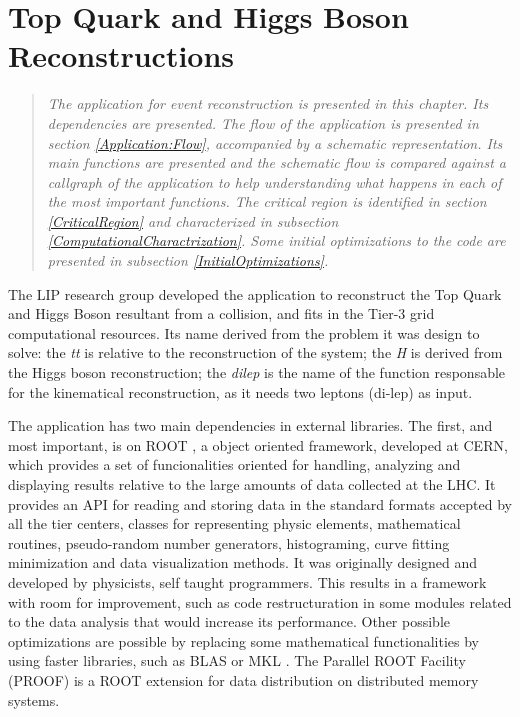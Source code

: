 \chapter{Top Quark and Higgs Boson Reconstructions}
\label{Application}

\begin{quote}
\textit{The \tth application for event reconstruction is presented in this chapter. Its dependencies are presented. The flow of the application is presented in section \ref{Application:Flow}, accompanied by a schematic representation. Its main functions are presented and the schematic flow is compared against a callgraph of the application to help understanding what happens in each of the most important functions. The critical region is identified in section \ref{CriticalRegion} and characterized in subsection \ref{ComputationalCharactrization}. Some initial optimizations to the code are presented in subsection \ref{InitialOptimizations}.}
\end{quote}

The LIP research group developed the \tth application to reconstruct the Top Quark and Higgs Boson resultant from a collision, and fits in the Tier-3 grid computational resources. Its name derived from the problem it was design to solve: the \textit{tt} is relative to the reconstruction of the \ttbar system; the \textit{H} is derived from the Higgs boson reconstruction; the \textit{dilep} is the name of the function responsable for the kinematical reconstruction, as it needs two leptons (di-lep) as input.

The application has two main dependencies in external libraries. The first, and most important, is on ROOT \cite{CERN:ROOT}, a object oriented framework, developed at CERN, which provides a set of funcionalities oriented for handling, analyzing and displaying results relative to the large amounts of data collected at the LHC. It provides an API for reading and storing data in the standard formats accepted by all the tier centers, classes for representing physic elements, mathematical routines, pseudo-random number generators, histograming, curve fitting minimization and data visualization methods. It was originally designed and developed by physicists, self taught programmers. This results in a framework with room for improvement, such as code restructuration in some modules related to the data analysis that would increase its performance. Other possible optimizations are possible by replacing some mathematical functionalities by using faster libraries, such as BLAS \cite{BLAS} or MKL \cite{MKL}. The Parallel ROOT Facility (PROOF) \cite{CERN:PROOF} is a ROOT extension for data distribution on distributed memory systems.

